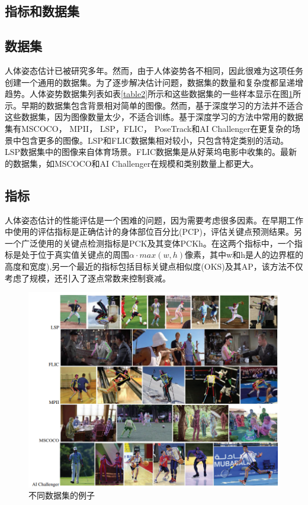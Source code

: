 \documentclass[hyperref]{ctexart}
\begin{document}
	\begin{multicols}{2}
		\section{指标和数据集}
		\subsection{数据集}
		人体姿态估计已被研究多年。然而，由于人体姿势各不相同，因此很难为这项任务创建一个通用的数据集。为了逐步解决估计问题，数据集的数量和复杂度都呈递增趋势。人体姿势数据集列表如表\ref{table2}所示和这些数据集的一些样本显示在图\ref{q}所示。早期的数据集包含背景相对简单的图像。然而，基于深度学习的方法并不适合这些数据集，因为图像数量太少，不适合训练。基于深度学习的方法中常用的数据集有MSCOCO\cite{lin2014microsoft}， MPII\cite{andriluka20142d}， LSP\cite{johnson2010clustered}，FLIC\cite{sapp2013modec}， PoseTrack\cite{Andriluka2018PoseTrackAB}和AI Challenger\cite{Wu2017AIC}在更复杂的场景中包含更多的图像。LSP和FLIC数据集相对较小，只包含特定类别的活动。LSP数据集中的图像来自体育场景。FLIC数据集是从好莱坞电影中收集的。最新的数据集，如MSCOCO和AI Challenger在规模和类别数量上都更大。
		
		
		\subsection{指标}
		人体姿态估计的性能评估是一个困难的问题，因为需要考虑很多因素。在早期工作中使用的评估指标是正确估计的身体部位百分比(PCP)\cite{ferrari2008progressive}，评估关键点预测结果。另一个广泛使用的关键点检测指标是PCK\cite{yang2011articulated}及其变体PCKh。在这两个指标中，一个指标是处于位于真实值关键点的周围$\alpha\cdot max(w,h)$像素，其中w和h是人的边界框的高度和宽度),另一个最近的指标包括目标关键点相似度(OKS)及其AP，该方法不仅考虑了规模，还引入了逐点常数来控制衰减。
	\end{multicols}

\begin{figure}[H]
	\centering
	\includegraphics[scale = 0.5]{12}
	\caption{不同数据集的例子}
	\label{q}
\end{figure}
\end{document}
